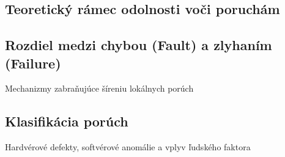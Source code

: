 \documentclass[../../../thesis.tex]{subfiles}
\begin{document}
    \subsection{Teoretický rámec odolnosti voči poruchám}

    \subsection*{Rozdiel medzi chybou (Fault) a zlyhaním (Failure)}
    Mechanizmy zabraňujúce šíreniu lokálnych porúch

    \subsection*{Klasifikácia porúch}
    Hardvérové defekty, softvérové anomálie a vplyv ľudského faktora
\end{document}

